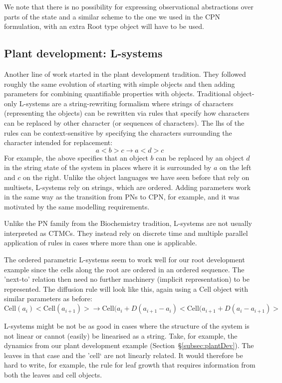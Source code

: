 \documentclass[phd]{infthesis}
\newcommand{\ssec}[1]{\S\ref{subsec:#1}}
\newcommand{\mr}[1]{\mathrm{#1}}
\begin{document}
We note that there is no possibility for expressing observational abstractions
over parts of the state and a similar scheme to the one we used in the CPN
formulation, with an extra $\mr{Root}$ type object will have to be used.


\subsection{Plant development: L-systems}
\label{subsec:lSystems}
Another line of work started in the plant development tradition.
They followed roughly the same evolution of starting with simple objects and
then adding parameters for combining quantifiable properties with
objects. Traditional object-only L-systems are a string-rewriting formalism
where strings of characters (representing the objects) can be rewritten via
rules that specify how characters can be replaced by other character (or
sequences of characters). The lhs of the rules can be context-sensitive by
specifying the characters surrounding the character intended for replacement:
$$
a< b > c \rightarrow a < d > c
$$
For example, the above specifies that an object $b$ can be replaced by an object
$d$ in the string state of the system in places where it is surrounded by $a$ on
the left and $c$ on the right. Unlike the object languages we have seen before
that rely on multisets, L-systems rely on strings, which are ordered. Adding
parameters work in the same way as the transition from PNs to CPN, for example,
and it was motivated by the same modelling requirements.

Unlike the PN family from the Biochemistry tradition, L-systems are not usually
interpreted as CTMCs. They instead rely on discrete time and multiple parallel
application of rules in cases where more than one is applicable.

The ordered parametric L-systems seem to work well for our root development
example since the cells along the root are ordered in an ordered sequence. The
'next-to' relation then need no further machinery (implicit representation) to
be represented. The diffusion rule will look like this, again using a
$\mr{Cell}$ object with similar parameters as before:
$$
\mr{Cell}(a_i)< \mr{Cell}(a_{i+1}) > \rightarrow \mr{Cell}(a_i+D(a_{i+1}-a_i)< \mr{Cell}(a_{i+1}+D(a_i-a_{i+1}) >
$$

L-systems might be not be as good in cases where the structure of the system is
not linear or cannot (easily) be linearised as a string. Take, for example, the
dynamics from our plant development example (Section~\ssec{plantDev}). The
leaves in that case and the 'cell` are not linearly related. It would therefore
be hard to write, for example, the rule for leaf growth that requires
information from both the leaves and cell objects.
\end{document}
